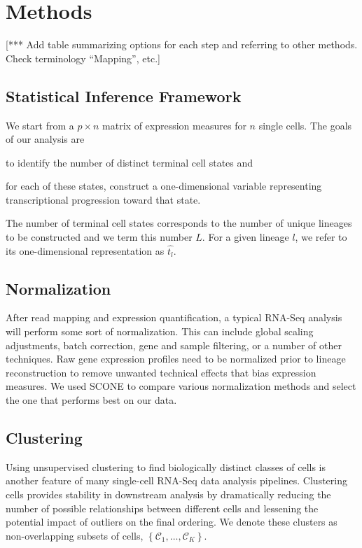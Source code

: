\documentclass[11pt]{article}\usepackage[]{graphicx}\usepackage[]{color}
\begin{document}
\section{Methods}

[*** Add table summarizing options for each step and referring to other methods. Check terminology ``Mapping'', etc.]

\subsection{Statistical Inference Framework}
We start from a $p \times n$ matrix of expression measures for $n$ single cells. The goals of our analysis are 
\begin{enumerate*}[font={\bfseries}]
\item to identify the number of distinct terminal cell states and
\item for each of these states, construct a one-dimensional variable representing transcriptional progression toward that state.
\end{enumerate*}
The number of terminal cell states corresponds to the number of unique lineages to be constructed and we term this number $L$. For a given lineage $l$, we refer to its one-dimensional representation as $\hat{t_l}$.

\subsection{Normalization}
After read mapping and expression quantification, a typical RNA-Seq analysis will perform some sort of normalization. This can include global scaling adjustments, batch correction, gene and sample filtering, or a number of other techniques. Raw gene expression profiles need to be normalized prior to lineage reconstruction to remove unwanted technical effects that bias expression measures. We used SCONE to compare various normalization methods and select the one that performs best on our data.

\subsection{Clustering}
Using unsupervised clustering to find biologically distinct classes of cells is another feature of many single-cell RNA-Seq data analysis pipelines. Clustering cells provides stability in downstream analysis by dramatically reducing the number of possible relationships between different cells and lessening the potential impact of outliers on the final ordering. We denote these clusters as non-overlapping subsets of cells, $\left\{\mathcal{C}_1,\dots,\mathcal{C}_K\right\}$.
\end{document}
